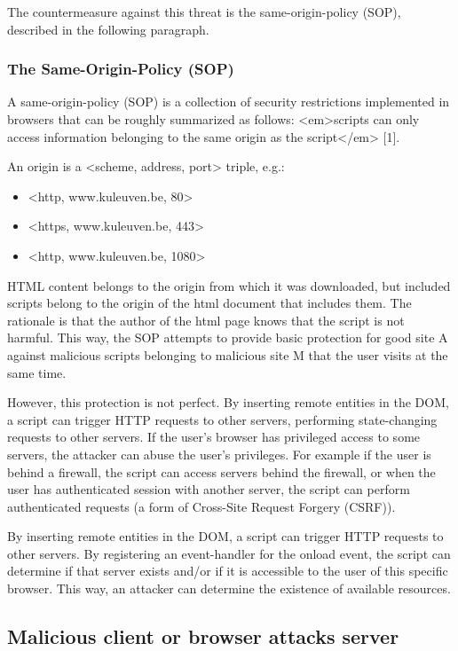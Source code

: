 The countermeasure against this threat is the same-origin-policy (SOP), described in the following paragraph.


\subsubsection{The Same-Origin-Policy (SOP)}

A same-origin-policy (SOP) is a collection of security restrictions implemented in browsers that can be roughly summarized as follows: <em>scripts can only access information belonging to the same origin as the script</em> [1].

An origin is a <scheme, address, port> triple, e.g.:
\begin{itemize}
	\item <http, www.kuleuven.be, 80>
	\item <https, www.kuleuven.be, 443>
	\item <http, www.kuleuven.be, 1080>
\end{itemize}

HTML content belongs to the origin from which it was downloaded, but included scripts belong to the origin of the html document that includes them. The rationale is that the author of the html page knows that the script is not harmful. This way, the SOP attempts to provide basic protection for good site A against malicious scripts belonging to malicious site M that the user visits at the same time.

However, this protection is not perfect. By inserting remote entities in the DOM, a script can trigger HTTP requests to other servers, performing state-changing requests to other servers. If the user's browser has privileged access to some servers, the attacker can abuse the user's privileges. For example if the user is behind a firewall, the script can access servers behind the firewall, or when the user has authenticated session with another server, the script can perform authenticated requests (a form of Cross-Site Request Forgery (CSRF)).

By inserting remote entities in the DOM, a script can trigger HTTP requests to other servers. By registering an event-handler for the onload event, the script can determine if that server exists and/or if it is accessible to the user of this specific browser. This way, an attacker can determine the existence of available resources.


\subsection{Malicious client or browser attacks server}

